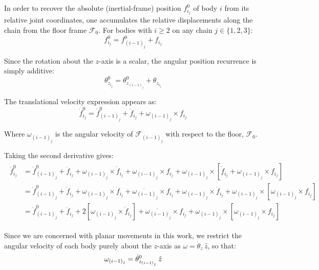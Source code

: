 \documentclass[11pt]{article}
\theoremstyle{definition}
\begin{document}
In order to recover the absolute (inertial-frame) position $f^{0}_{i_j}$ of body $i$ from its relative joint coordinates, one accumulates the relative displacements along the chain from the floor frame $\mathcal{F}_{0}$. For bodies with $i \geq 2$ on any chain $j \in \{1,2,3\}$:
\begin{equation} \label{eq:frameref}
    f^{0}_{i_j} = f^{0}_{(i-1)_j} + f_{i_j}
\end{equation}

Since the rotation about the $z$-axis is a scalar, the angular position recurrence is simply additive:
\begin{equation} \label{eq:angleref}
    \theta^{0}_{z_{i_j}} = \theta^{0}_{z_{(i-1)_j}} + \theta_{z_{i_j}}
\end{equation}

The translational velocity expression appears as:
\begin{equation}
    \dot{f}^{0}_{i_j} = \dot{f}^{0}_{(i-1)_j} + \dot{f}_{i_j} + \omega_{(i-1)_j}
    \times
    f_{i_j}
\end{equation}

Where $\omega_{(i-1)_j}$ is the angular velocity \supercite{Ginsberg1984_AdvancedDynamics} of $\mathcal{F}_{(i-1)_j}$ with respect to the floor, $\mathcal{F}_{0}$.

Taking the second derivative gives:
\begin{align}
    \begin{split}
        \ddot{f}^{0}_{i_j} &= \ddot{f}^{0}_{(i-1)_j} + \ddot{f}_{i_j}
        + \omega_{(i-1)_j} \times \dot{f}_{i_j}
        + \dot{\omega_{(i-1)_j}} \times f_{i_j}
        + \omega_{(i-1)_j} \times \left[
            \dot{f}_{i_j} + \omega_{(i-1)_j} \times f_{i_j}
        \right] \\
        &= \ddot{f}^{0}_{(i-1)_j} + \ddot{f}_{i_j}
        + \omega_{(i-1)_j} \times \dot{f}_{i_j}
        + \dot{\omega_{(i-1)_j}} \times f_{i_j}
        + \omega_{(i-1)_j} \times \dot{f}_{i_j}
        + \omega_{(i-1)_j} \times \left[
            \omega_{(i-1)_j} \times f_{i_j}
        \right] \\
        &= \ddot{f}^{0}_{(i-1)_j} + \ddot{f}_{i_j}
        + 2 \left[ \omega_{(i-1)_j} \times \dot{f}_{i_j} \right]
        + \dot{\omega_{(i-1)_j}} \times f_{i_j}
        + \omega_{(i-1)_j} \times \left[
            \omega_{(i-1)_j} \times f_{i_j}
        \right]
    \end{split}
\end{align}

Since we are concerned with planar movements in this work, we restrict the angular velocity of each body purely about the $z$-axis as $\omega = \dot{\theta}_z\,\hat{z}$, so that:
\begin{equation}
    \omega_{(i-1)_j} = \dot{\theta}^{0}_{z_{(i-1)_j}}\,\hat{z} \notag
\end{equation}
\end{document}
